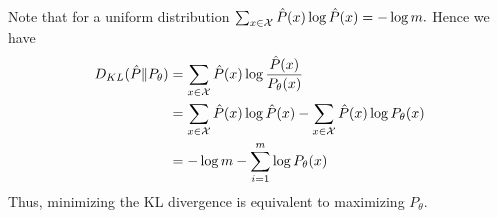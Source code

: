 \begin{answer}
    Note that for a uniform distribution $\sum_{x\in\cal X}\hat P(x)\log\hat P(x) = -\log m.$
    Hence we have
    $$
    \begin{aligned}
        D_{KL}(\hat P\|P_\theta) &=  \sum_{x\in\cal X} \hat P(x)\log \frac{\hat P(x)}{P_\theta(x)}\\
        &= \sum_{x\in\cal X}\hat P(x)\log\hat P(x) - \sum_{x\in\cal X}\hat P(x)\log P_\theta(x)\\
        &= -\log m - \sum_{i=1}^m \log P_\theta(x)
    \end{aligned}
    $$
    Thus, minimizing the KL divergence is equivalent to maximizing $P_{\theta}.$	
    
\end{answer}
